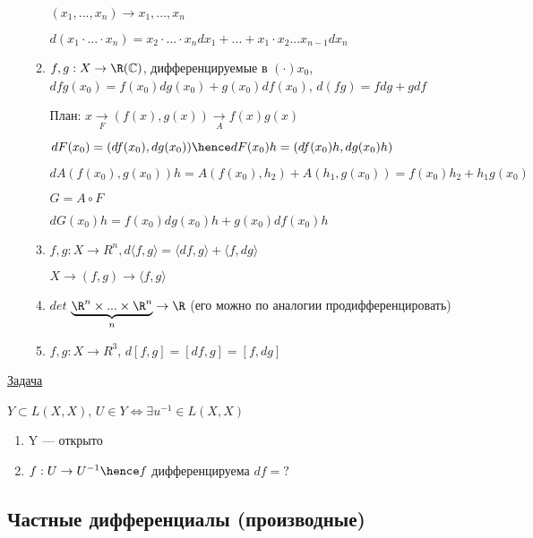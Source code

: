 \begin{examples}
\begin{enumerate}
\begin{enumerate}
        $(x_1, ..., x_n) \to x_1, ..., x_n$

        $d(x_1 \cdot...\cdot x_n) = x_2 \cdot ... \cdot x_n dx_1 + ... + x_1 \cdot x_2 ... x_{n - 1} dx_n$

        \item $f, g : X \to \R (\mathbb{C})$, дифференцируемые в $(\cdot)x_0$, $dfg(x_0) = f(x_0)dg(x_0) + g(x_0) df(x_0)$, $d(fg) = fdg + gdf$
        
        План: $x \underset{F}{\to} (f(x), g(x)) \underset{A}{\to} f(x) g(x)$

        $dF(x_0) = (df(x_0), dg(x_0)) \hence dF(x_0)h = (df(x_0)h, dg(x_0)h)$

        $dA(f(x_0), g(x_0))h = A(f(x_0), h_2) + A(h_1, g(x_0)) = f(x_0)h_2 + h_1g(x_0)$

        $G = A \circ F$

        $dG(x_0)h = f(x_0)dg(x_0)h + g(x_0)df(x_0)h$

        \item $f, g : X \to R^n, d \langle f, g \rangle = \langle df, g \rangle + \langle f, dg \rangle$
    
        $X \to (f, g) \to \langle f, g \rangle$

        \item $det$ $\underbrace{\R ^ n \times ... \times \R^n}_{n} \to \R$ (его можно по аналогии продифференцировать)
        
        \item $f, g : X \to R^3$, $d[f, g] = [df, g] = [f, dg]$
        
    \end{enumerate}
\end{enumerate}

\underline{Задача} 

$Y \subset L(X, X)$, $U \in Y \Longleftrightarrow \exists u^{-1} \in L(X, X)$

\begin{enumerate}
    \item Y --- открыто
    \item $f : U \to U^{-1} \hence f$ дифференцируема $df = ?$
\end{enumerate}
    

\end{examples}

\newpage

\subsection{Частные дифференциалы (производные)}

